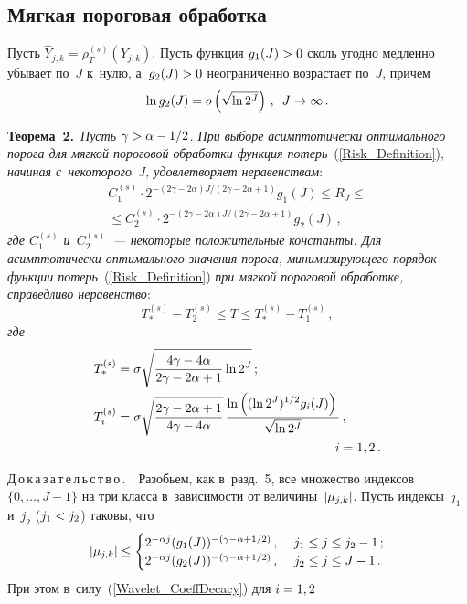 \begin{multicols}{2}
\section{Мягкая пороговая обработка}

Пусть $\hat{Y}_{j,k}=\rho_T^{(s)}(Y_{j,k})$.
Пусть функция $g_1(J)\hm>0$ сколь угодно медленно убывает по~$J$ к~нулю,
 а~$g_2(J)\hm>0$ неограниченно возрастает по~$J$, причем
\begin{equation}
\ln  g_2(J)=o\left(\sqrt{\ln 2^J}\right)\,, \enskip  J\to\infty\,.
\label{g_2_Grow}
\end{equation}

\noindent
\textbf{Теорема~2.}\
\textit{Пусть $\gamma\hm>\alpha\hm-1/2$. При выборе асимптотически оптимального 
порога для мяг\-кой пороговой обработки функция потерь}~(\ref{Risk_Definition}), 
\textit{начиная с~некоторого~$J$, удовле\-тво\-ря\-ет неравенствам}:
\begin{multline*}
C_1^{(s)}\cdot2^{-({2\gamma-2\alpha})J/({2\gamma-2\alpha+1})}g_1(J)\leq 
R_J\leq{}\\
{}\leq C_2^{(s)}\cdot2^{-({2\gamma-2\alpha})J/({2\gamma-2\alpha+1})}g_2(J)\,,
\end{multline*}
\textit{где $C_1^{(s)}$ и~$C_2^{(s)}$~--- некоторые положительные константы.
Для асимптотически оптимального значения порога, ми\-ни\-ми\-зи\-ру\-юще\-го 
порядок функции потерь}~(\ref{Risk_Definition}) \textit{при мягкой пороговой 
обработке, справедливо неравенство}:
$$
T_*^{(s)}-T_2^{(s)}\leq T\leq  T_*^{(s)}-T_1^{(s)}\,, 
$$
\textit{где}
\begin{align*}
T_*^{(s)}&=\sigma\sqrt{\fr{4\gamma-4\alpha}{2\gamma-2\alpha+1}\ln2^J}\,;
\\
T_i^{(s)}&=\sigma\sqrt{\fr{2\gamma-2\alpha+1}{4\gamma-4\alpha}}\,
\fr{\ln\left((\ln 2^J)^{1/2}g_i(J)\right)}{\sqrt{\ln 2^J}}\,, \\
&\hspace*{60mm}  i=1,2\,.
\end{align*}


\noindent
{Д\,о\,к\,а\,з\,а\,т\,е\,л\,ь\,с\,т\,в\,о\,.}\ \
 Разобьем, как в~разд.~5, все множество индексов $\{0,\ldots,J-1\}$ 
 на три класса в~за\-ви\-си\-мости от величины~$|\mu_{j,k}|$. Пусть индексы~$j_1$ 
 и~$j_2$ ($j_1\hm< j_2$) таковы, что
\begin{equation*}
|\mu_{j,k}|\leq
\begin{cases}
 2^{-\alpha j}(g_1(J))^{-(\gamma-\alpha+1/2)}\,, &\ j_1\leq j\leq j_2-1\,;\\
2^{-\alpha j}(g_2(J))^{-(\gamma-\alpha+1/2)}\,, &\ j_2\leq j \leq J-1\,.
\end{cases}
\end{equation*}
При этом в~силу~(\ref{Wavelet_CoeffDecacy}) для $i\hm=1,2$


\end{multicols}
